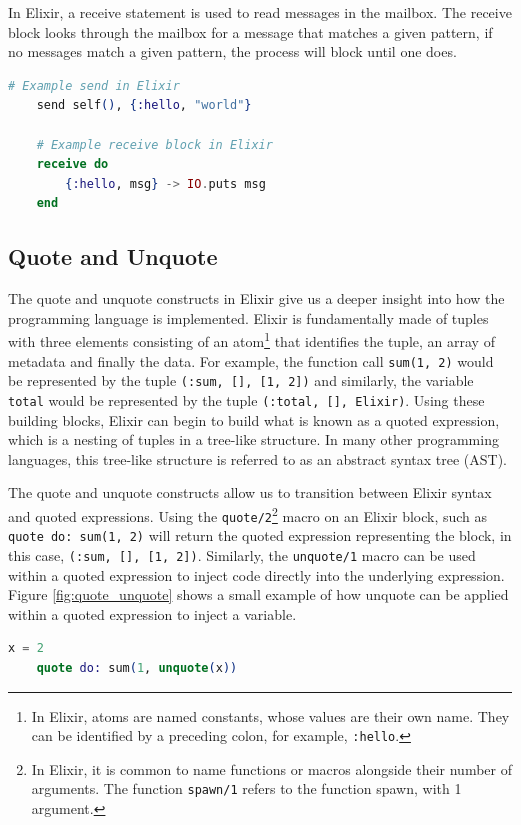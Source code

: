 \par
In Elixir, a receive statement is used to read messages in the mailbox. The receive block looks through the mailbox for a message that matches a given pattern, if no messages match a given pattern, the process will block until one does.
\begin{lstlisting}[language=Elixir, xleftmargin=.4\linewidth, caption={An example of spawn/1 and spawn/4 in Elixir for spawning a new lightweight process and a new Elixir node}]
    # Example send in Elixir
    send self(), {:hello, "world"}

    # Example receive block in Elixir
    receive do
        {:hello, msg} -> IO.puts msg
    end
\end{lstlisting}
\subsection[]{Quote and Unquote}
The quote and unquote constructs in Elixir give us a deeper insight into how the programming language is implemented. Elixir is fundamentally made of tuples with three elements consisting of an atom\footnote{In Elixir, atoms are named constants, whose values are their own name. They can be identified by a preceding colon, for example, \texttt{:hello}.} that identifies the tuple, an array of metadata and finally the data. For example, the function call \texttt{sum(1, 2)} would be represented by the tuple \texttt{(:sum, [], [1, 2])} and similarly, the variable \texttt{total} would be represented by the tuple \texttt{(:total, [], Elixir)}. Using these building blocks, Elixir can begin to build what is known as a quoted expression, which is a nesting of tuples in a tree-like structure. In many other programming languages, this tree-like structure is referred to as an abstract syntax tree (AST).
\par
The quote and unquote constructs allow us to transition between Elixir syntax and quoted expressions. Using the \texttt{quote/2}\footnote{In Elixir, it is common to name functions or macros alongside their number of arguments. The function \texttt{spawn/1} refers to the function spawn, with 1 argument.} macro on an Elixir block, such as \texttt{quote do: sum(1, 2)} will return the quoted expression representing the block, in this case, \texttt{(:sum, [], [1, 2])}. Similarly, the \texttt{unquote/1} macro can be used within a quoted expression to inject code directly into the underlying expression. Figure \ref{fig:quote_unquote} shows a small example of how unquote can be applied within a quoted expression to inject a variable.
\begin{lstlisting}[language=Elixir, xleftmargin=.4\linewidth, caption={Elixir example of \texttt{quote/2} and \texttt{unquote/1}.}, label={fig:quote_unquote}]
    x = 2
    quote do: sum(1, unquote(x))
\end{lstlisting}
\par

